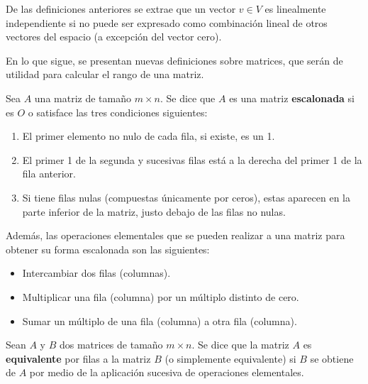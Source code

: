 \begin{observacion}
    De las definiciones anteriores se extrae que un vector $v \in V$ es linealmente independiente si no puede ser expresado como combinación lineal de otros vectores del espacio (a excepción del vector cero).\newline
\end{observacion}

En lo que sigue, se presentan nuevas definiciones sobre matrices, que serán de utilidad para calcular el rango de una matriz.

\begin{definicion}
    Sea $A$ una matriz de tamaño $m \times n$. Se dice que $A$ es una matriz \textbf{escalonada} si es $O$ o satisface las tres condiciones siguientes:

    \begin{enumerate}
        \item El primer elemento no nulo de cada fila, si existe, es un 1.
        \item El primer 1 de la segunda y sucesivas filas está a la derecha del primer 1 de la fila anterior.
        \item Si tiene filas nulas (compuestas únicamente por ceros), estas aparecen en la parte inferior de la matriz, justo debajo de las filas no nulas.\newline
    \end{enumerate}

    Además, las operaciones elementales que se pueden realizar a una matriz para obtener su forma escalonada son las siguientes:

    \begin{itemize}
        \item Intercambiar dos filas (columnas).
        \item Multiplicar una fila (columna) por un múltiplo distinto de cero.
        \item Sumar un múltiplo de una fila (columna) a otra fila (columna).\newline
    \end{itemize}
\end{definicion}

\begin{definicion}
    Sean $A$ y $B$ dos matrices de tamaño $m \times n$. Se dice que la matriz $A$ es \textbf{equivalente} por filas a la matriz $B$ (o simplemente equivalente) si $B$ se obtiene de $A$ por medio de la aplicación sucesiva de operaciones elementales.\newline
\end{definicion}

